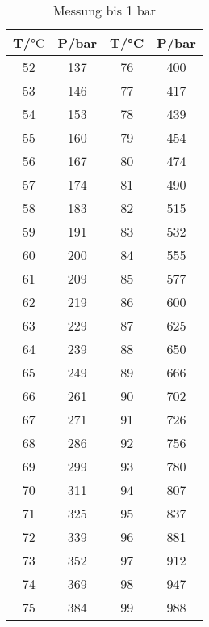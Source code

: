   \begin{table}
    \centering
    \begin{tabular}{c c c c}
      \toprule
      T/$\si{\celsius}$ & P/\si{\bar} & T/\si{\celsius} & P/\si{\bar}
      \\
      \midrule
      52    &   137  &  76  &  400  \\
      53    &   146  &  77  &  417  \\
      54    &   153  &  78  &  439  \\
      55    &   160  &  79  &  454  \\
      56    &   167  &  80  &  474  \\
      57    &   174  &  81  &  490  \\
      58    &   183  &  82  &  515  \\
      59    &   191  &  83  &  532  \\
      60    &   200  &  84  &  555  \\
      61    &   209  &  85  &  577  \\
      62    &   219  &  86  &  600  \\
      63    &   229  &  87  &  625  \\
      64    &   239  &  88  &  650  \\
      65    &   249  &  89  &  666  \\
      66    &   261  &  90  &  702  \\
      67    &   271  &  91  &  726  \\
      68    &   286  &  92  &  756  \\
      69    &   299  &  93  &  780  \\
      70    &   311  &  94  &  807  \\
      71    &   325  &  95  &  837  \\
      72    &   339  &  96  &  881  \\
      73    &   352  &  97  &  912  \\
      74    &   369  &  98  &  947  \\
      75    &   384  &  99  &  988  \\
      \bottomrule
    \end{tabular}
    \caption{Messung bis 1 bar}
    \label{tab:data1}

  \end{table}
